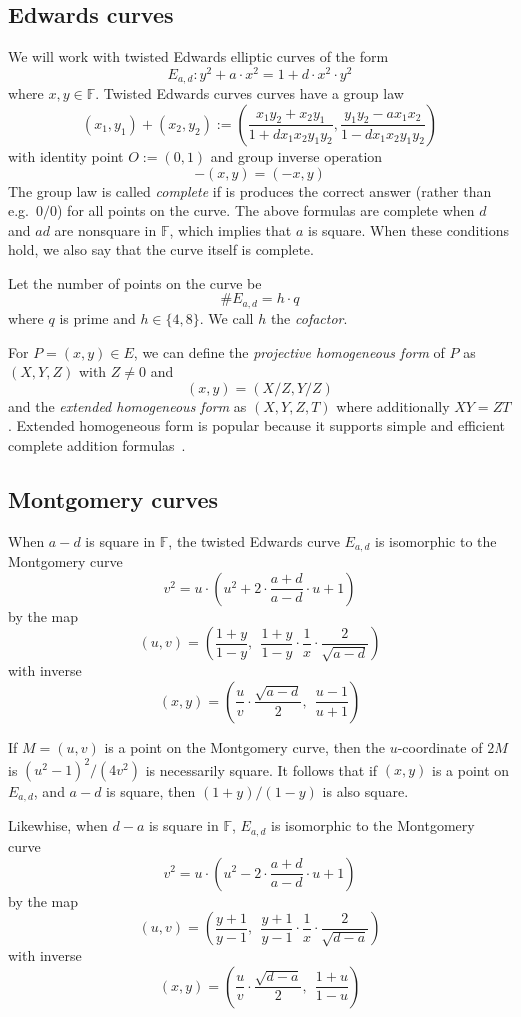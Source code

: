 \documentclass[11pt]{article}
\def\F{\ensuremath{\mathbb{F}}}
\def\O{\ensuremath{O}}
\begin{document}
\subsection{Edwards curves}
We will work with twisted Edwards elliptic curves of the form 
%
$$E_{a,d} : y^2 + a\cdot x^2 = 1 + d\cdot x^2\cdot y^2$$
%
where $x,y\in\F$. Twisted Edwards curves curves have a group law
$$(x_1,y_1) + (x_2,y_2) := 
\left(
\frac{x_1 y_2 + x_2 y_1}{1+d x_1 x_2 y_1 y_2},
\frac{y_1 y_2 - a x_1 x_2}{1-d x_1 x_2 y_1 y_2}
\right)
$$
with identity point $\O := (0,1)$ and group inverse operation $$-(x,y) = (-x,y)$$
The group law is called \textit{complete} if is produces the correct answer (rather than e.g.\ $0/0$) for all points on the curve.  The above formulas are complete when $d$ and $ad$ are nonsquare in \F, which implies that $a$ is square.  When these conditions hold, we also say that the curve itself is complete.

Let the number of points on the curve be $$\#E_{a,d} = h\cdot q$$ where $q$ is prime and $h\in\{4,8\}$.  We call $h$ the \textit{cofactor}.

For $P = (x,y)\in E$, we can define the \textit{projective homogeneous form} of $P$ as $(X,Y,Z)$ with $Z\neq 0$ and $$(x,y) = (X/Z,Y/Z)$$ and the \textit{extended homogeneous form} as $(X,Y,Z,T)$ where additionally $XY=ZT$.  Extended homogeneous form is popular because it supports simple and efficient complete addition formulas~\cite{hisil}.

\subsection{Montgomery curves}

When $a-d$ is square in \F, the twisted Edwards curve $E_{a,d}$ is isomorphic to the Montgomery curve
$$v^2 = u\cdot\left(u^2 + 2\cdot\frac{a+d}{a-d}\cdot u + 1\right)$$
by the map
$$(u,v) = \left(\frac{1+y}{1-y},\ \ \frac{1+y}{1-y}\cdot\frac1x\cdot\frac{2}{\sqrt{a-d}}\right)$$
with inverse
$$(x,y) = \left(\frac{u}{v}\cdot\frac{\sqrt{a-d}}{2},\ \ \frac{u-1}{u+1}\right)$$

If $M = (u,v)$ is a point on the Montgomery curve, then the $u$-coordinate of $2M$ is $(u^2-1)^2 / (4v^2)$ is necessarily square.  It follows that if $(x,y)$ is a point on $E_{a,d}$, and $a-d$ is square, then $(1+y)/(1-y)$ is also square.

Likewhise, when $d-a$ is square in \F, $E_{a,d}$ is isomorphic to the Montgomery curve
$$v^2 = u\cdot\left(u^2 - 2\cdot\frac{a+d}{a-d}\cdot u + 1\right)$$
by the map
$$(u,v) = \left(\frac{y+1}{y-1},\ \ \frac{y+1}{y-1}\cdot\frac1x\cdot\frac{2}{\sqrt{d-a}}\right)$$
with inverse
$$(x,y) = \left(\frac{u}{v}\cdot\frac{\sqrt{d-a}}{2},\ \ \frac{1+u}{1-u}\right)$$
\end{document}
